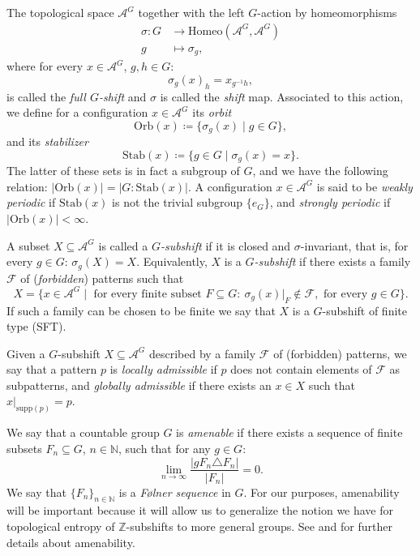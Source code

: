 \documentclass[cupthm,crop,info]{CUP-JNL-ETS}%
\theoremstyle{cupplain}
\theoremstyle{cupdefinition}
\theoremstyle{cupremark}
\theoremstyle{cupproof}
\numberwithin{equation}{section}
\begin{document}
The topological space $\mathcal{A}^G$ together with the left $G$-action by homeomorphisms
\begin{align*}
\sigma:G&\to \mathrm{Homeo}(\mathcal{A}^G,\mathcal{A}^G)\\
g&\mapsto \sigma_g,
\end{align*}
where for every $x\in \mathcal{A}^G$, $g,h\in G$:
$$
\sigma_g(x)_h=x_{g^{-1}h},
$$
is called the \textit{full $G$-shift} and $\sigma$ is called the \textit{shift} map. Associated to this action, we define for a configuration $x\in \mathcal{A}^G$ its \textit{orbit} $$\mathrm{Orb}(x)\coloneqq\{\sigma_g(x)\mid g\in G \},$$ and its \textit{stabilizer} $$\mathrm{Stab}(x)\coloneqq \{g\in G\mid \sigma_g(x)=x \}.$$ The latter of these sets is in fact a subgroup of $G$, and we have the following relation: $|\mathrm{Orb}(x)|=|G:\mathrm{Stab}(x)|$. A configuration $x\in \mathcal{A}^G$ is said to be \textit{weakly periodic} if $\mathrm{Stab}(x)$ is not the trivial subgroup $\{e_G\}$, and \textit{strongly periodic} if $|\mathrm{Orb}(x)|<\infty$.


A subset $X\subseteq \mathcal{A}^G$ is called a \textit{$G$-subshift} if it is closed and $\sigma$-invariant, that is, for every $g\in G$: $\sigma_g(X)=X$. Equivalently, $X$ is a \textit{$G$-subshift} if there exists a family $\mathcal{F}$ of (\textit{forbidden}) patterns such that
$$
X=\{x\in \mathcal{A}^G\mid \text{ for every finite subset }F\subseteq G:\ \sigma_g(x)|_{F}\notin \mathcal{F}, \text{ for every }g\in G \}.
$$ 
If such a family can be chosen to be finite we say that $X$ is a $G$-subshift of finite type (SFT).


Given a $G$-subshift $X\subseteq \mathcal{A}^G$ described by a family $\mathcal{F}$ of (forbidden) patterns, we say that a pattern $p$ is \textit{locally admissible} if $p$ does not contain elements of $\mathcal{F}$ as subpatterns, and \textit{globally admissible} if there exists an $x\in X$ such that $x|_{\mathrm{supp}(p)}=p$.


We say that a countable group $G$ is \textit{amenable} if there exists a sequence of finite subsets $F_n\subseteq G$, $n\in \mathbb{N}$, such that for any $g\in G$:
$$
\lim_{n\to \infty}\frac{|gF_n\triangle F_n|}{|F_n|}=0.
$$
We say that $\{F_n\}_{n\in \mathbb{N}}$ is a \textit{F\o lner sequence} in $G$. For our purposes, amenability will be important because it will allow us to generalize the notion we have for topological entropy of $\mathbb{Z}$-subshifts to more general groups. See \cite[Chapter 9]{Loh_geometric} and \cite[Chapter 4]{Cellular_automata_and_groups} for further details about amenability.
\end{document}
